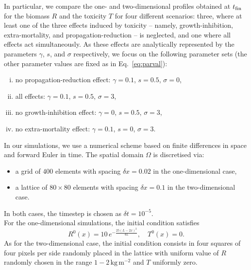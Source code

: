 \documentclass[11pt]{elsarticle}
\theoremstyle{plain}
\theoremstyle{definition}
\theoremstyle{myremark}
\begin{document}
In particular, we compare the one- and two-dimensional profiles obtained at $t_{\rm fin}$ for the biomass $R$ and the toxicity $T$ for four different scenarios: three, where at least one of the three effects induced by toxicity -- namely, growth-inhibition, extra-mortality, and propagation-reduction -- is neglected, and one where all effects act simultaneously. As these effects are analytically represented by the parameters $\gamma$, $s$, and $\sigma$ respectively, we focus on the following parameter sets (the other parameter values are fixed as in Eq.~\eqref{eq:parval}):
\begin{enumerate}[(i)]
    \item\label{scenario:i} no propagation-reduction effect: $\gamma=0.1$, $s=0.5$, $\sigma=0$,
    \item\label{scenario:ii} all effects: $\gamma=0.1$, $s=0.5$, $\sigma=3$,
    \item\label{scenario:iii} no growth-inhibition effect: $\gamma=0$, $s=0.5$, $\sigma=3$, %
    \item\label{scenario:iv} no extra-mortality effect: $\gamma=0.1$, $s=0$, $\sigma=3$.
\end{enumerate}
In our simulations, we use a numerical scheme based on finite differences in space and forward Euler in time. The spatial domain $\Omega$ is discretised via:
\begin{itemize}
    \item[-] a grid of $400$ elements with spacing $\delta x = 0.02$ in the one-dimensional case,
    \item[-] a lattice of $80 \times 80$ elements with spacing $\delta x = 0.1$ in the two-dimensional case.
\end{itemize}
In both cases, the timestep is chosen as $\delta t=10^{-5}$. \\
For the one-dimensional simulations, the initial condition satisfies
\begin{equation}
    R^0(x) = 10 \, e^{-\frac{25 (L-2 x)^2}{4 L}}, \quad T^0(x) = 0.
\end{equation}
As for the two-dimensional case, the initial condition consists in four squares of four pixels per side randomly placed in the lattice with uniform value of $R$ randomly chosen in the range $1-2 \, \textrm{kg} \, \textrm{m}^{-2}$ and $T$ uniformly zero.


\end{document}

